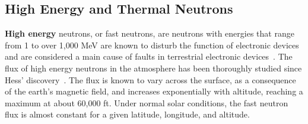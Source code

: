 
\subsection{High Energy and Thermal Neutrons}
\label{sec_environment}

\textbf{High energy} neutrons, or fast neutrons, are neutrons with energies that range from 1 to over 1,000 MeV are known to disturb the function of electronic devices and are considered a main cause of faults in terrestrial electronic devices~\cite{Baumann2005,ziegler2004ser}. %
The flux of high energy neutrons in the atmosphere has been thoroughly studied since Hess' discovery~\cite{Hess,Ziegler1996}. The flux is known to vary across the surface, as a consequence of the earth's magnetic field, and increases exponentially with altitude, reaching a maximum at about 60,000 ft. Under normal solar conditions, the fast neutron flux is almost constant for a given latitude, longitude, and altitude. 

